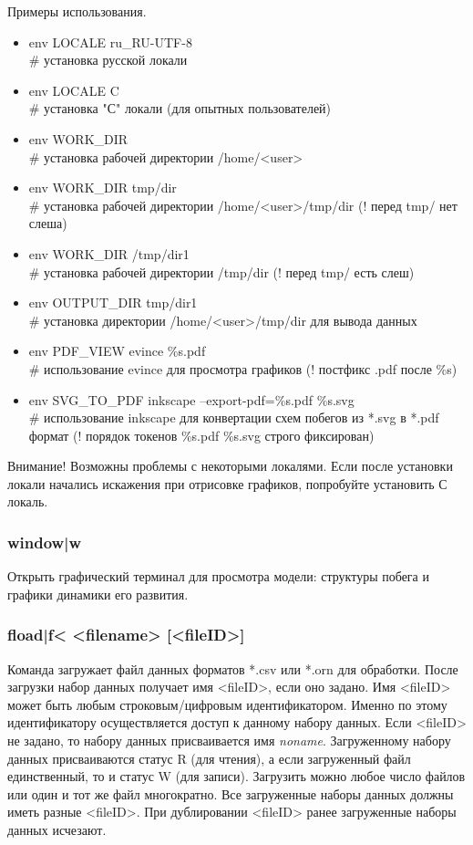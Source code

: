 \documentclass[a4paper]{article}
\begin{document}
Примеры использования. 
\begin{itemize}
\item env LOCALE ru\_RU-UTF-8 
\\ \# установка русской локали

\item env LOCALE C 
\\ \# установка "С" локали (для опытных пользователей)

\item env WORK\_DIR ~ 
\\ \# установка рабочей директории /home/<user>

\item env WORK\_DIR tmp/dir 
\\ \# установка рабочей директории /home/<user>/tmp/dir (! перед tmp/ нет слеша)

\item env WORK\_DIR /tmp/dir1 
\\ \# установка рабочей директории /tmp/dir (! перед tmp/ есть слеш)

\item env OUTPUT\_DIR tmp/dir1 
\\ \# установка директории /home/<user>/tmp/dir для вывода данных

\item env PDF\_VIEW evince \%s.pdf 
\\ \# использование evince для просмотра графиков (! постфикс .pdf после \%s)

\item env SVG\_TO\_PDF inkscape --export-pdf=\%s.pdf \%s.svg 
\\ \# использование inkscape для конвертации схем побегов из *.svg в *.pdf формат (! порядок токенов \%s.pdf \%s.svg строго фиксирован)
\end{itemize}

Внимание! Возможны проблемы с некоторыми локалями. Если после установки локали начались искажения при отрисовке графиков, попробуйте установить С локаль. 

\subsubsection{window|w}
Открыть графический терминал для просмотра модели: структуры побега и графики динамики его развития.

\subsubsection{fload|f< <filename> [<fileID>]} 
Команда загружает файл данных форматов *.csv или *.orn для обработки. После загрузки набор данных получает имя <fileID>, если оно задано. Имя <fileID> может быть любым строковым/цифровым идентификатором. Именно по этому идентификатору осуществляется доступ к данному набору данных. Если <fileID> не задано, то набору данных присваивается имя \textit{noname}. Загруженному набору данных присваиваются статус R (для чтения), а если загруженный файл единственный, то и статус W (для записи). Загрузить можно любое число файлов или один и тот же файл многократно. Все загруженные наборы данных должны иметь разные <fileID>. При дублировании <fileID> ранее загруженные наборы данных исчезают.
\end{document}
